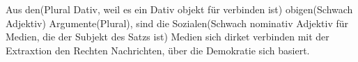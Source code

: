 \documentclass[a4paper]{article}
\begin{document}
        Aus den(Plural Dativ, weil es ein Dativ objekt für verbinden ist) obigen(Schwach Adjektiv) Argumente(Plural), sind die Sozialen(Schwach nominativ Adjektiv für Medien, die der Subjekt des Satzs ist) Medien sich dirket verbinden mit der Extraxtion den Rechten Nachrichten, über die Demokratie sich basiert.
        
        
        
\end{document}
